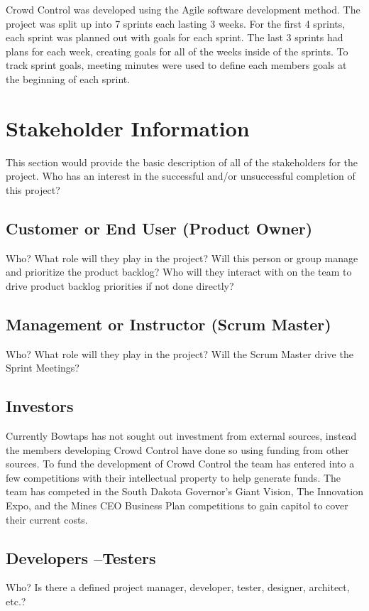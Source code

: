Crowd Control was developed using the Agile software development method.  The project was split up into 7 sprints each lasting 3 weeks.  For the first 4 sprints, each sprint was planned out with goals for each sprint.  The last 3 sprints had plans for each week, creating goals for all of the weeks inside of the sprints.  To track sprint goals, meeting minutes were used to define each members goals at the beginning of each sprint.


\section{ Stakeholder Information}


This section would provide the basic description of all of the stakeholders for 
the project.  Who has an interest in the successful and/or unsuccessful completion 
of this project? 


\subsection{Customer or End User (Product Owner)}
Who?  What role will they play in the project?  Will this person or group manage 
and prioritize the product backlog?  Who will they interact with on the team to 
drive product backlog priorities if not done directly? 

\subsection{Management or Instructor (Scrum Master)}
Who?  What role will they play in the project?  Will the Scrum Master drive the 
Sprint Meetings? 


\subsection{Investors}
Currently Bowtaps has not sought out investment from external sources, instead the members developing Crowd Control have done so using funding from other sources.  To fund the development of Crowd Control the team has entered into a few competitions with their intellectual property to help generate funds.   The team has competed in the South Dakota Governor's Giant Vision, The Innovation Expo, and the Mines CEO Business Plan competitions to gain capitol to cover their current costs.


\subsection{Developers --Testers}
Who?  Is there a defined project manager, developer, tester, designer, architect, 
etc.? 

